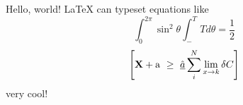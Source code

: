 \documentclass[12 pt]{article}
\begin{document}
Hello, world! {\LaTeX} can typeset equations like
\begin{equation}
\int^{2\pi}_0\sin^2\theta \int^{T}_-T d\theta = \frac{1}{2}
\end{equation}
\begin{equation}
\left[
{\bf X} + {\rm a} \ \geq\
\underline{\hat a} \sum_i^N \lim_{x \rightarrow k} \delta C
\right]
\end{equation}
very cool!
\end{document}
